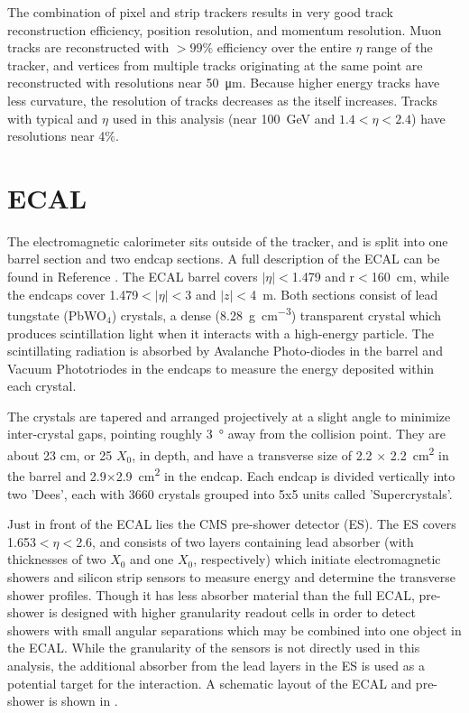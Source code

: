 The combination of pixel and strip trackers results in very good track reconstruction efficiency, position resolution, and momentum resolution.
Muon tracks are reconstructed with $>99\%$ efficiency over the entire $\eta$ range of the tracker, and vertices from multiple tracks originating at the same point are reconstructed with resolutions near \SI{50}{\micro\meter}.
Because higher energy tracks have less curvature, the \pt resolution of tracks decreases as the \pt itself increases. Tracks with typical \pt and $\eta$ used in this analysis (\pt near \SI{100}{\giga\eV} and $1.4<\eta<2.4$) have resolutions near 4$\%$. 

\section{ECAL}
The electromagnetic calorimeter sits outside of the tracker, and is split into one barrel section and two endcap sections. 
A full description of the ECAL can be found in Reference \cite{ECALtdr}.
The ECAL barrel covers $\lvert\eta\rvert<$1.479 and r$<$\SI{160}{\centi\meter}, while the endcaps cover 1.479$<\lvert\eta\rvert<$3 and $\lvert z \rvert<$\SI{4}{\meter}. 
Both sections consist of lead tungstate (PbWO$_4$) crystals, a dense (\SI{8.28}{\gram\per\cubic\centi\meter}) transparent crystal which produces scintillation light when it interacts with a high-energy particle. 
The scintillating radiation is absorbed by Avalanche Photo-diodes in the barrel and Vacuum Phototriodes in the endcaps to measure the energy deposited within each 
crystal. 

The crystals are tapered and arranged projectively at a slight angle to minimize inter-crystal gaps, pointing roughly \SI{3}{\degree} away from the collision point. 
They are about 23 cm, or 25 $X_0$, in depth, and have a transverse size of 2.2 $\times$ \SI{2.2}{\centi\meter^2} in the barrel and 2.9$\times$\SI{2.9}{\centi\meter^2} in the endcap. 
Each endcap is divided vertically into two 'Dees', each with 3660 crystals grouped into 5x5 units called 'Supercrystals'.

Just in front of the ECAL lies the CMS pre-shower detector (ES). 
The ES covers 1.653$<\eta<$2.6, and consists of two layers containing lead absorber (with thicknesses of two $X_0$ and one $X_0$, respectively) which initiate electromagnetic showers and silicon strip sensors to measure energy and determine the transverse shower profiles. 
Though it has less absorber material than the full ECAL, pre-shower is designed with higher granularity readout cells in order to detect showers with small angular separations which may be combined into one object in the ECAL.
While the granularity of the sensors is not directly used in this analysis, the additional absorber from the lead layers in the ES is used as a potential target for the \dbrem interaction.
A schematic layout of the ECAL and pre-shower is shown in .

